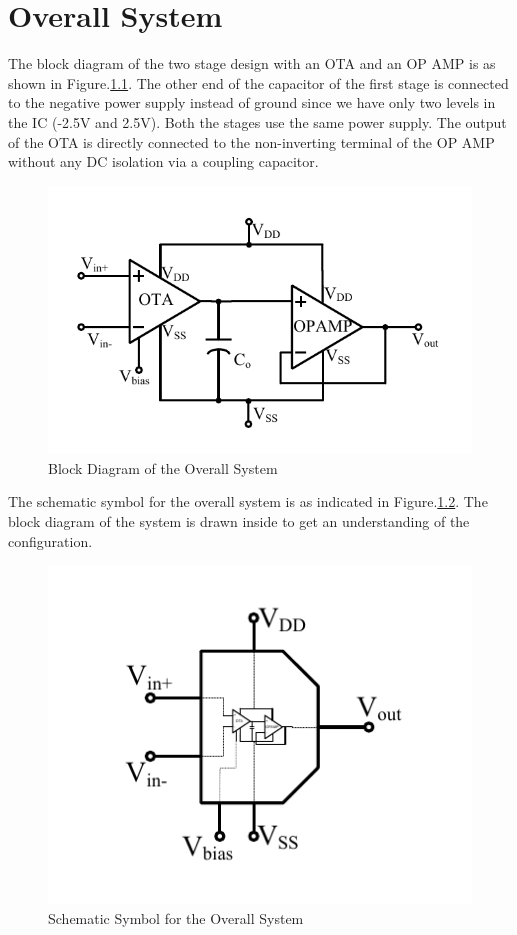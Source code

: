 \chapter{Overall System}

The block diagram of the two stage design with an OTA and an OP AMP is as shown in Figure.\ref{fig:System_Block_Diagram}. The other end of the capacitor of the first stage is connected to the negative power supply instead of ground since we have only two levels in the IC (-2.5V and 2.5V). Both the stages use the same power supply. The output of the OTA is directly connected to the non-inverting terminal of the OP AMP without any DC isolation via a coupling capacitor.

\begin{figure} [H]
\centering
\includegraphics[scale=1]{Figures/System_Level/System_Overview.pdf}
\caption{Block Diagram of the Overall System}
\label{fig:System_Block_Diagram}
\end{figure}

The schematic symbol for the overall system is as indicated in Figure.\ref{fig:System_Symbol}. The block diagram of the system is drawn inside to get an understanding of the configuration.

\begin{figure} [H]
\centering
\includegraphics[scale=1]{Figures/System_Level/System_Symbol.pdf}
\caption{Schematic Symbol for the Overall System}
\label{fig:System_Symbol}
\end{figure}

